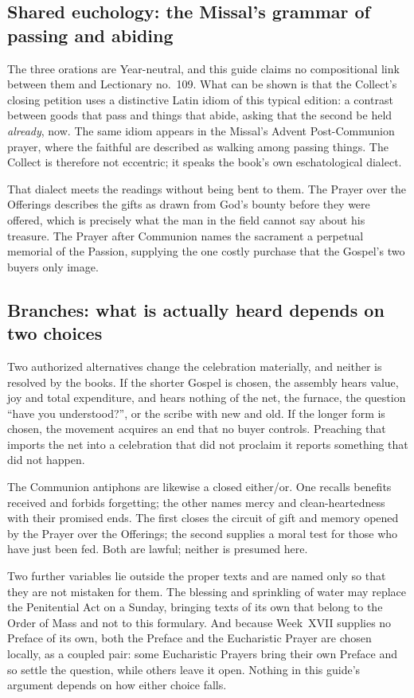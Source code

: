 \subsection*{Shared euchology: the Missal's grammar of passing and abiding}

The three orations are Year-neutral, and this guide claims no compositional link between them and Lectionary no.~109. What can be shown is that the Collect's closing petition uses a distinctive Latin idiom of this typical edition: a contrast between goods that pass and things that abide, asking that the second be held \emph{already}, now. The same idiom appears in the Missal's Advent Post-Communion prayer, where the faithful are described as walking among passing things. The Collect is therefore not eccentric; it speaks the book's own eschatological dialect.

That dialect meets the readings without being bent to them. The Prayer over the Offerings describes the gifts as drawn from God's bounty before they were offered, which is precisely what the man in the field cannot say about his treasure. The Prayer after Communion names the sacrament a perpetual memorial of the Passion, supplying the one costly purchase that the Gospel's two buyers only image.

\subsection*{Branches: what is actually heard depends on two choices}

Two authorized alternatives change the celebration materially, and neither is resolved by the books. If the shorter Gospel is chosen, the assembly hears value, joy and total expenditure, and hears nothing of the net, the furnace, the question ``have you understood?'', or the scribe with new and old. If the longer form is chosen, the movement acquires an end that no buyer controls. Preaching that imports the net into a celebration that did not proclaim it reports something that did not happen.

The Communion antiphons are likewise a closed either/or. One recalls benefits received and forbids forgetting; the other names mercy and clean-heartedness with their promised ends. The first closes the circuit of gift and memory opened by the Prayer over the Offerings; the second supplies a moral test for those who have just been fed. Both are lawful; neither is presumed here.

Two further variables lie outside the proper texts and are named only so that they are not mistaken for them. The blessing and sprinkling of water may replace the Penitential Act on a Sunday, bringing texts of its own that belong to the Order of Mass and not to this formulary. And because Week~XVII supplies no Preface of its own, both the Preface and the Eucharistic Prayer are chosen locally, as a coupled pair: some Eucharistic Prayers bring their own Preface and so settle the question, while others leave it open. Nothing in this guide's argument depends on how either choice falls.

